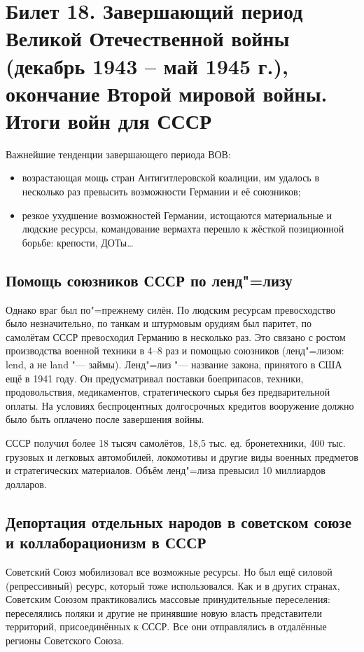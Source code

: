 \section{Билет 18. Завершающий период Великой Отечественной войны (декабрь 1943 -- май 1945 г.), окончание Второй мировой войны. Итоги войн для СССР}


Важнейшие тенденции завершающего периода ВОВ:
\begin{itemize}
    \item возрастающая мощь стран Антигитлеровской коалиции, им удалось в несколько раз превысить возможности Германии и её союзников;
    \item резкое ухудшение возможностей Германии, истощаются материальные и людские ресурсы, командование вермахта перешло к жёсткой позиционной борьбе: крепости, ДОТы\dots
\end{itemize}

\subsection{Помощь союзников СССР по ленд"=лизу}

Однако враг был по"=прежнему силён. По людским ресурсам превосходство было незначительно, по танкам и штурмовым орудиям был паритет, по самолётам СССР превосходил Германию в несколько раз. Это связано с ростом производства военной техники в 4--8 раз и помощью союзников (ленд"=лизом: lend, а не land "--- займы). Ленд"=лиз "--- название закона, принятого в США ещё в 1941 году. Он предусматривал поставки боеприпасов, техники, продовольствия, медикаментов, стратегического сырья без предварительной оплаты. На условиях беспроцентных долгосрочных кредитов вооружение должно было быть оплачено после завершения войны.

СССР получил более 18 тысяч самолётов, 18,5 тыс. ед. бронетехники, 400 тыс. грузовых и легковых автомобилей, локомотивы и другие виды военных предметов и стратегических материалов. Объём ленд"=лиза превысил 10 миллиардов долларов.

\subsection{Депортация отдельных народов в советском союзе и коллаборационизм в СССР}

Советский Союз мобилизовал все возможные ресурсы. Но был ещё силовой (репрессивный) ресурс, который тоже использовался. Как и в других странах, Советским Союзом практиковались массовые принудительные переселения: переселялись поляки и другие не принявшие новую власть представители территорий, присоединённых к СССР. Все они отправлялись в отдалённые регионы Советского Союза.

